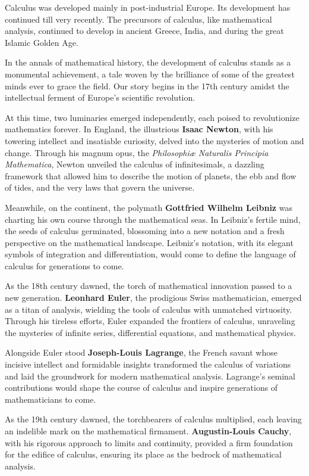 
Calculus was developed mainly in post-industrial Europe. Its development has continued till very recently. The precursors of calculus, like mathematical analysis, continued to develop in ancient Greece, India, and during the great Islamic Golden Age.


In the annals of mathematical history, the development of calculus stands as a monumental achievement, a tale woven by the brilliance of some of the greatest minds ever to grace the field. Our story begins in the 17th century amidst the intellectual ferment of Europe's scientific revolution.

At this time, two luminaries emerged independently, each poised to revolutionize mathematics forever. In England, the illustrious \textbf{Isaac Newton}, with his towering intellect and insatiable curiosity, delved into the mysteries of motion and change. Through his magnum opus, the \textit{Philosophiæ Naturalis Principia Mathematica}, Newton unveiled the calculus of infinitesimals, a dazzling framework that allowed him to describe the motion of planets, the ebb and flow of tides, and the very laws that govern the universe.

Meanwhile, on the continent, the polymath \textbf{Gottfried Wilhelm Leibniz} was charting his own course through the mathematical seas. In Leibniz's fertile mind, the seeds of calculus germinated, blossoming into a new notation and a fresh perspective on the mathematical landscape. Leibniz's notation, with its elegant symbols of integration and differentiation, would come to define the language of calculus for generations to come.

As the 18th century dawned, the torch of mathematical innovation passed to a new generation. \textbf{Leonhard Euler}, the prodigious Swiss mathematician, emerged as a titan of analysis, wielding the tools of calculus with unmatched virtuosity. Through his tireless efforts, Euler expanded the frontiers of calculus, unraveling the mysteries of infinite series, differential equations, and mathematical physics.

Alongside Euler stood \textbf{Joseph-Louis Lagrange}, the French savant whose incisive intellect and formidable insights transformed the calculus of variations and laid the groundwork for modern mathematical analysis. Lagrange's seminal contributions would shape the course of calculus and inspire generations of mathematicians to come.

As the 19th century dawned, the torchbearers of calculus multiplied, each leaving an indelible mark on the mathematical firmament. \textbf{Augustin-Louis Cauchy}, with his rigorous approach to limits and continuity, provided a firm foundation for the edifice of calculus, ensuring its place as the bedrock of mathematical analysis.

